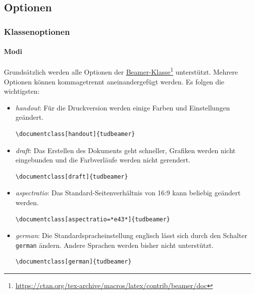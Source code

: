 \documentclass[german,notoc]{tudbeamer}%
\begin{document}
\subsection{Optionen}
\begin{frame}[fragile]
	\frametitle{Klassenoptionen}
	\framesubtitle{Modi}

	Grundsätzlich werden alle Optionen der \href{https://ctan.org/tex-archive/macros/latex/contrib/beamer/doc}{		Beamer-Klasse}\footnote{\href{https://ctan.org/tex-archive/macros/latex/contrib/beamer/doc}{
				\url{https://ctan.org/tex-archive/macros/latex/contrib/beamer/doc}}}	
	unterstützt. Mehrere Optionen können kommagetrennt aneinandergefügt werden. Es folgen die wichtigsten:
	\begin{itemize}
		\item \emph{handout}: Für die Druckversion werden einige Farben und Einstellungen geändert.
			\begin{lstlisting}[gobble=8,style=latex,numbers=none]
				\documentclass[handout]{tudbeamer}
			\end{lstlisting}
		\item \emph{draft}: Das Erstellen des Dokuments geht schneller, Grafiken werden nicht eingebunden und die Farbverläufe werden nicht gerendert.
			\begin{lstlisting}[gobble=8,style=latex,numbers=none]
				\documentclass[draft]{tudbeamer}
			\end{lstlisting}
		\item \emph{aspectratio}: Das Standard-Seitenverhältnis von 16:9 kann beliebig geändert werden.
			\begin{lstlisting}[gobble=8,style=latex,numbers=none]
				\documentclass[aspectratio=*e43*]{tudbeamer}
			\end{lstlisting} 
		\item \emph{german}: Die Standardspracheinstellung englisch lässt sich durch den Schalter \texttt{german} ändern. Andere Sprachen werden bisher nicht unterstützt.
			\begin{lstlisting}[gobble=8,style=latex,numbers=none]
				\documentclass[german]{tudbeamer}
			\end{lstlisting} 
	\end{itemize}
\end{frame}
\end{document}
